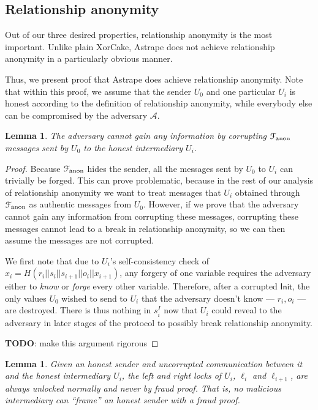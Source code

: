 \documentclass[USenglish,oneside,twocolumn]{article}
\newtheorem{lemma}[theorem]{Lemma}
\begin{document}
\subsection{Relationship anonymity}

Out of our three desired properties, relationship anonymity is the most important. Unlike plain XorCake, Astrape does not achieve relationship anonymity in a particularly obvious manner.

Thus, we present proof that Astrape does achieve relationship anonymity. Note that within this proof, we assume that the sender $U_0$ and one particular $U_i$ is honest according to the definition of relationship anonymity, while everybody else can be compromised by the adversary $\mathcal{A}$.

\begin{lemma}\label{lem:nocorrupt}
    The adversary cannot gain any information by corrupting $\mathcal{F}_\mathrm{anon}$ messages sent by $U_0$ to the honest intermediary $U_i$.
\end{lemma}

\begin{proof}
    Because $\mathcal{F}_\mathrm{anon}$ hides the sender, all the messages sent by $U_0$ to $U_i$ can trivially be forged. This can prove problematic, because in the rest of our analysis of relationship anonymity we want to treat messages that $U_i$ obtained through $\mathcal{F}_\mathrm{anon}$ as authentic messages from $U_0$. However, if we prove that the adversary cannot gain any information from corrupting these messages, corrupting these messages cannot lead to a break in relationship anonymity, so we can then assume the messages are not corrupted.

    We first note that due to $U_i$'s self-consistency check of $x_i = H(r_i||s_i||s_{i+1}||o_i||x_{i+1})$, any forgery of one variable requires the adversary either to \emph{know} or \emph{forge} every other variable. Therefore, after a corrupted $\mathsf{Init}$, the only values $U_0$ wished to send to $U_i$ that the adversary doesn't know --- $r_i,o_i$  --- are destroyed. There is thus nothing in $s^I_i$ now that $U_i$ could reveal to the adversary in later stages of the protocol to possibly break relationship anonymity.

    \textbf{TODO}: make this argument rigorous

\end{proof}

\begin{lemma}\label{lem:nocol}
    Given an honest sender and uncorrupted communication between it and the honest intermediary $U_i$, the left and right locks of $U_i$, $\ell_i$ and $\ell_{i+1}$, are always unlocked normally and never by fraud proof. That is, no malicious intermediary can ``frame'' an honest sender with a fraud proof.
\end{lemma}
\end{document}
